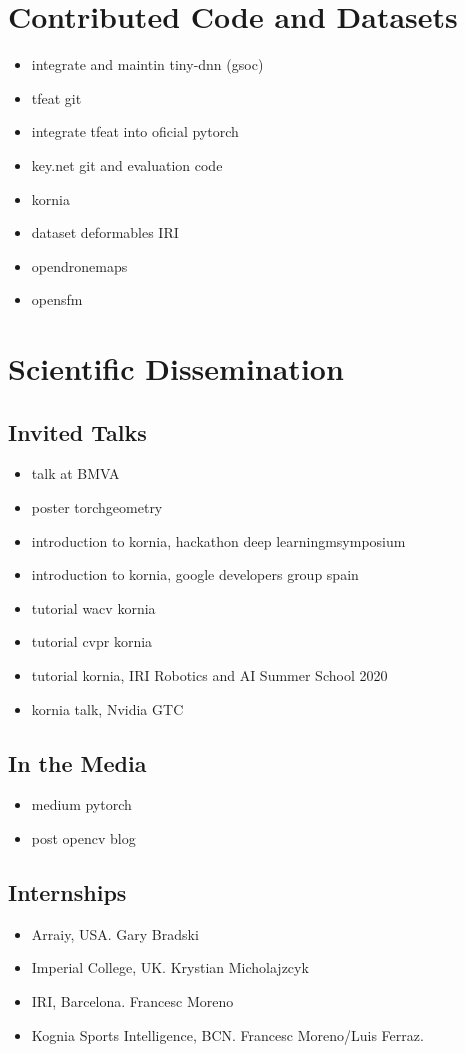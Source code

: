 \section{Contributed Code and Datasets}
\begin{itemize}
\item integrate and maintin tiny-dnn (gsoc)
\item tfeat git
\item integrate tfeat into oficial pytorch
\item key.net git and evaluation code
\item kornia
\item dataset deformables IRI
\item opendronemaps
\item opensfm
\end{itemize}

\section{Scientific Dissemination}

\subsection{Invited Talks}
\begin{itemize}
\item talk at BMVA
\item poster torchgeometry
\item introduction to kornia, hackathon deep learningmsymposium
\item introduction to kornia, google developers group spain
\item tutorial wacv kornia
\item tutorial cvpr kornia
\item tutorial kornia, IRI Robotics and AI Summer School 2020
\item kornia talk, Nvidia GTC
\end{itemize}

\subsection{In the Media}
\begin{itemize}
\item medium pytorch
\item post opencv blog
\end{itemize}

\subsection{Internships}
\begin{itemize}
\item Arraiy, USA. Gary Bradski
\item Imperial College, UK. Krystian Micholajzcyk
\item IRI, Barcelona. Francesc Moreno
\item Kognia Sports Intelligence, BCN. Francesc Moreno/Luis Ferraz.
\end{itemize}

